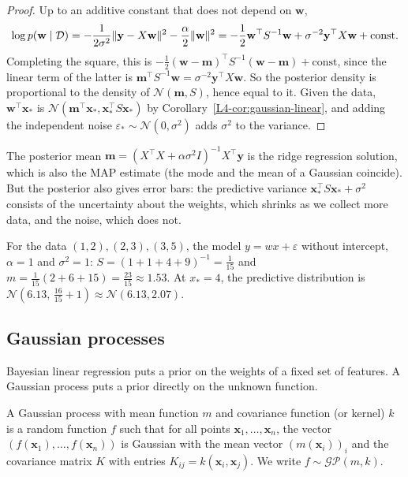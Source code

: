 \begin{proof}
    Up to an additive constant that does not depend on $\mathbf{w}$,
    \[\log p(\mathbf{w} \mid \mathcal{D}) = -\frac{1}{2\sigma^2}\lVert \mathbf{y} - X\mathbf{w} \rVert^2 - \frac{\alpha}{2}\lVert \mathbf{w} \rVert^2 = -\frac{1}{2}\mathbf{w}^\top S^{-1}\mathbf{w} + \sigma^{-2}\mathbf{y}^\top X\mathbf{w} + \text{const}.\]
    Completing the square, this is $-\frac{1}{2}(\mathbf{w} - \mathbf{m})^\top S^{-1}(\mathbf{w} - \mathbf{m}) + \text{const}$, since the linear term of the latter is $\mathbf{m}^\top S^{-1}\mathbf{w} = \sigma^{-2}\mathbf{y}^\top X\mathbf{w}$. So the posterior density is proportional to the density of $\mathcal{N}(\mathbf{m}, S)$, hence equal to it. Given the data, $\mathbf{w}^\top\mathbf{x}_*$ is $\mathcal{N}(\mathbf{m}^\top\mathbf{x}_*, \mathbf{x}_*^\top S\mathbf{x}_*)$ by Corollary~\ref{L4-cor:gaussian-linear}, and adding the independent noise $\varepsilon_* \sim \mathcal{N}(0, \sigma^2)$ adds $\sigma^2$ to the variance.
\end{proof}

The posterior mean $\mathbf{m} = (X^\top X + \alpha\sigma^2 I)^{-1}X^\top\mathbf{y}$ is the ridge regression solution, which is also the MAP estimate (the mode and the mean of a Gaussian coincide). But the posterior also gives error bars: the predictive variance $\mathbf{x}_*^\top S\mathbf{x}_* + \sigma^2$ consists of the uncertainty about the weights, which shrinks as we collect more data, and the noise, which does not.

\begin{example}\label{L4-ex:blr}
    For the data $(1, 2), (2, 3), (3, 5)$, the model $y = wx + \varepsilon$ without intercept, $\alpha = 1$ and $\sigma^2 = 1$: $S = (1 + 1 + 4 + 9)^{-1} = \frac{1}{15}$ and $m = \frac{1}{15}(2 + 6 + 15) = \frac{23}{15} \approx 1.53$. At $x_* = 4$, the predictive distribution is $\mathcal{N}(6.13, \, \frac{16}{15} + 1) \approx \mathcal{N}(6.13, 2.07)$.
\end{example}

\subsection{Gaussian processes}\label{L4-sec:gp}

Bayesian linear regression puts a prior on the weights of a fixed set of features. A Gaussian process puts a prior directly on the unknown function.

\begin{definition}\label{L4-def:gp}
    A Gaussian process with mean function $m$ and covariance function (or kernel) $k$ is a random function $f$ such that for all points $\mathbf{x}_1, \ldots, \mathbf{x}_n$, the vector $(f(\mathbf{x}_1), \ldots, f(\mathbf{x}_n))$ is Gaussian with the mean vector $(m(\mathbf{x}_i))_i$ and the covariance matrix $K$ with entries $K_{ij} = k(\mathbf{x}_i, \mathbf{x}_j)$. We write $f \sim \mathcal{GP}(m, k)$.
\end{definition}

